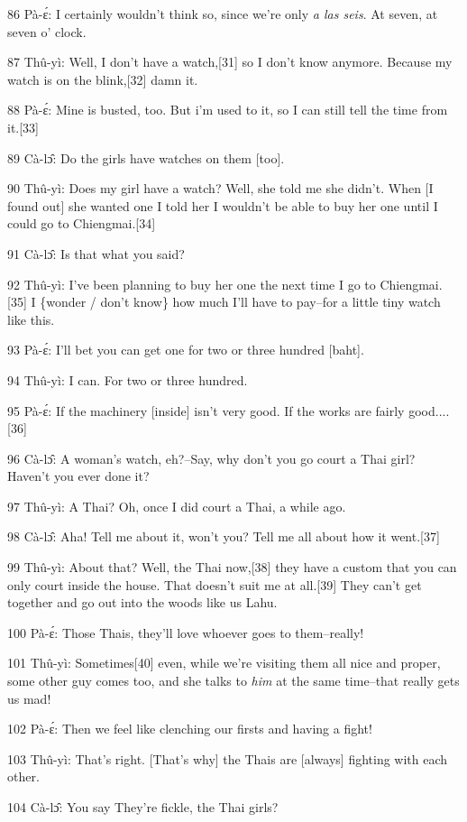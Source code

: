 86 Pà-ɛ́: I certainly wouldn't think so, since we're only \textit{a las seis}.
At seven, at seven o' clock.

87 Thû-yì: Well, I don't have a watch,[31] so I don't know anymore. Because my
watch is on the blink,[32] damn it.

88 Pà-ɛ́: Mine is busted, too. But i'm used to it, so I can still tell the time
from it.[33]

89 Cà-lɔ̂: Do the girls have watches on them [too].

90 Thû-yì: Does my girl have a watch? Well, she told me she didn't. When [I found
out] she wanted one I told her I wouldn't be able to buy her one until I could
go to Chiengmai.[34]

91 Cà-lɔ̂: Is that what you said?

92 Thû-yì: I've been planning to buy her one the next time I go to Chiengmai.[35]
I \{wonder / don't know\} how much I'll have to pay--for a little tiny watch like
this.

93 Pà-ɛ́: I'll bet you can get one for two or three hundred [baht].

94 Thû-yì: I can. For two or three hundred.

95 Pà-ɛ́: If the machinery [inside] isn't very good. If the works are fairly
good....[36]

96 Cà-lɔ̂: A woman's watch, eh?--Say, why don't you go court a Thai girl? Haven't
you ever done it?

97 Thû-yì: A Thai? Oh, once I did court a Thai, a while ago.

98 Cà-lɔ̂: Aha! Tell me about it, won't you? Tell me all about how it went.[37]

99 Thû-yì: About that? Well, the Thai now,[38] they have a custom that you can
only court inside the house. That doesn't suit me at all.[39] They can't get together
and go out into the woods like us Lahu.

100 Pà-ɛ́: Those Thais, they'll love whoever goes to them--really!

101 Thû-yì: Sometimes[40] even, while we're visiting them all nice and proper,
some other guy comes too, and she talks to \textit{him} at the same time--that
really gets us mad!

102 Pà-ɛ́: Then we feel like clenching our firsts and having a fight!

103 Thû-yì: That's right. [That's why] the Thais are [always] fighting with each
other.

104 Cà-lɔ̂: You say They're fickle, the Thai girls?

